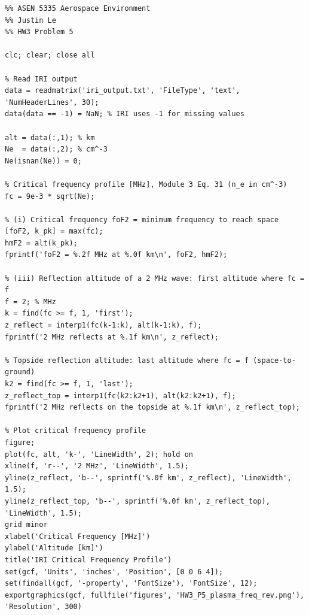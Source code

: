 \documentclass[11pt]{article}
\begin{document}
\newpage
\begin{lstlisting}
%% ASEN 5335 Aerospace Environment
%% Justin Le
%% HW3 Problem 5

clc; clear; close all

% Read IRI output
data = readmatrix('iri_output.txt', 'FileType', 'text', 'NumHeaderLines', 30);
data(data == -1) = NaN; % IRI uses -1 for missing values

alt = data(:,1); % km
Ne  = data(:,2); % cm^-3
Ne(isnan(Ne)) = 0;

% Critical frequency profile [MHz], Module 3 Eq. 31 (n_e in cm^-3)
fc = 9e-3 * sqrt(Ne);

% (i) Critical frequency foF2 = minimum frequency to reach space
[foF2, k_pk] = max(fc);
hmF2 = alt(k_pk);
fprintf('foF2 = %.2f MHz at %.0f km\n', foF2, hmF2);

% (iii) Reflection altitude of a 2 MHz wave: first altitude where fc = f
f = 2; % MHz
k = find(fc >= f, 1, 'first');
z_reflect = interp1(fc(k-1:k), alt(k-1:k), f);
fprintf('2 MHz reflects at %.1f km\n', z_reflect);

% Topside reflection altitude: last altitude where fc = f (space-to-ground)
k2 = find(fc >= f, 1, 'last');
z_reflect_top = interp1(fc(k2:k2+1), alt(k2:k2+1), f);
fprintf('2 MHz reflects on the topside at %.1f km\n', z_reflect_top);

% Plot critical frequency profile
figure;
plot(fc, alt, 'k-', 'LineWidth', 2); hold on
xline(f, 'r--', '2 MHz', 'LineWidth', 1.5);
yline(z_reflect, 'b--', sprintf('%.0f km', z_reflect), 'LineWidth', 1.5);
yline(z_reflect_top, 'b--', sprintf('%.0f km', z_reflect_top), 'LineWidth', 1.5);
grid minor
xlabel('Critical Frequency [MHz]')
ylabel('Altitude [km]')
title('IRI Critical Frequency Profile')
set(gcf, 'Units', 'inches', 'Position', [0 0 6 4]);
set(findall(gcf, '-property', 'FontSize'), 'FontSize', 12);
exportgraphics(gcf, fullfile('figures', 'HW3_P5_plasma_freq_rev.png'), 'Resolution', 300)
\end{lstlisting}
\end{document}
